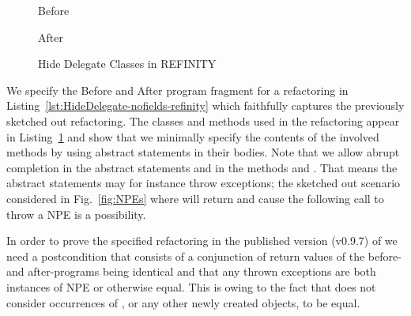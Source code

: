 \begin{figure}[tbp]
  \captionsetup{type=lstlisting}
  \centering
  \begin{sublstlisting}[b]{.4\linewidth}
    
    \caption{Before}
    \label{lst:HideDelegate-nofields-resource-refinity}
  \end{sublstlisting}\hspace{1cm}
  \begin{sublstlisting}[b]{.4\linewidth}
    
    \caption{After}
    \label{lst:HideDelegate-nofields-owner-refinity}
  \end{sublstlisting}
\caption{Hide Delegate Classes in REFINITY}
\label{lst:HideDelegate-nofields-classes-refinity}
\end{figure}
We specify the Before and After program fragment for a  refactoring in Listing~\ref{lst:HideDelegate-nofields-refinity} which faithfully captures the previously sketched out refactoring.
The classes and methods used in the refactoring appear in Listing~\ref{lst:HideDelegate-nofields-classes-refinity} and show that we minimally specify the contents of the involved methods by using abstract
statements in their bodies.
Note that we allow abrupt completion in the abstract statements  and  in the methods  and .
That means the abstract statements may for instance throw exceptions; the sketched out scenario considered in Fig.~\ref{fig:NPEs} where  will return  and cause the following call to throw a NPE is a possibility.

In order to prove the specified  refactoring in the published version (v0.9.7) of \Refinity{} we need a postcondition that consists of a conjunction of return values of the before- and after-programs being identical and
that any thrown exceptions are both instances of NPE or otherwise equal.
This is owing to the fact that \Refinity{} does not consider occurrences of , or any other newly created objects, to be equal.



